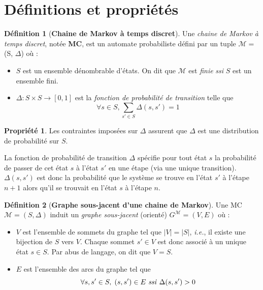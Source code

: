 \documentclass[12pt,a4paper]{report}
\theoremstyle{definition}
\newtheorem{definition}{Définition}[chapter]
\newtheorem{propriete}{Propriété}[chapter]
\theoremstyle{remark}
\newcommand{\ssi}{\textit{ssi} }
\newcommand{\ie}{\textit{i.e.}, }
\let\labelitemi\labelitemii
\begin{document}
\section{Définitions et propriétés}
\theoremstyle{definition}
\begin{definition}[\textbf{Chaine de Markov à temps discret}]
	
	Une \textit{chaine de Markov à temps discret}, notée \textbf{MC}, est un automate probabiliste défini par un tuple  $\mathcal{M} =$ (S, $\Delta$) où :
	\begin{itemize}
		\renewcommand{\labelitemi}{\tiny$\bullet$}
		\item $S$ est un ensemble dénombrable d'états. On dit que $\mathcal{M}$ est \textit{finie} \ssi $S$ est un ensemble fini.
		\item $\Delta: S \times S \rightarrow [0,1]$ est la \textit{fonction de probabilité de transition} telle que \[\forall s \in S, \sum_{s' \in S}\Delta(s, s')= 1\]
	\end{itemize}
\end{definition}

\begin{propriete}
	Les contraintes imposées sur $\Delta$ assurent que $\Delta$ est une distribution de probabilité sur $S$.
\end{propriete}
La fonction de probabilité de transition $\Delta$ spécifie pour tout état $s$ la probabilité de passer de cet état $s$ à l'état $s'$ en une étape (via une unique transition). 
$\Delta(s, s')$ est donc la probabilité que le système se trouve en l'état $s'$ à l'étape $n+1$ alors qu'il se trouvait en l'état $s$ à l'étape $n$. \\

\begin{definition}[\textbf{Graphe sous-jacent d'une chaine de Markov}]
	Une MC $\mathcal{M} = (S, \Delta)$ induit un \textit{graphe sous-jacent} (orienté) $G^\mathcal{M} = (V, E)$ où :
	\begin{itemize}
		\renewcommand{\labelitemi}{\tiny$\bullet$}
		\item $V$ est l'ensemble de sommets du graphe tel que $|V| = |S|$, \ie il existe une bijection de $S$ vers $V$. Chaque sommet $s' \in V$ est donc associé à un unique état $s \in S$. Par abus de langage, on dit que $V = S$.
		\item $E$ est l'ensemble des arcs du graphe tel que \[ \forall s, s' \in S, \; (s, s') \in E \text{ \ssi} \Delta(s, s') > 0\]
	\end{itemize}
\end{definition}
\end{document}
